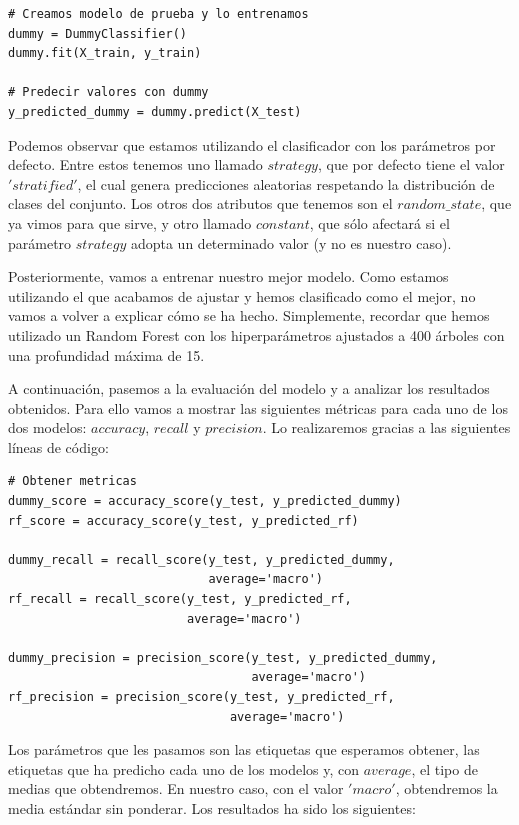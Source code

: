 \documentclass[11pt,a4paper]{article}
\begin{document}
\begin{lstlisting}
# Creamos modelo de prueba y lo entrenamos
dummy = DummyClassifier()
dummy.fit(X_train, y_train)

# Predecir valores con dummy
y_predicted_dummy = dummy.predict(X_test)
\end{lstlisting}

Podemos observar que estamos utilizando el clasificador con los parámetros por defecto. Entre estos tenemos uno llamado $strategy$, que por defecto tiene el valor $'stratified'$, el cual genera predicciones aleatorias respetando la distribución de clases del conjunto. Los otros dos atributos que tenemos son el $random\_state$, que ya vimos para que sirve, y otro llamado $constant$, que sólo afectará si el parámetro $strategy$ adopta un determinado valor (y no es nuestro caso).

Posteriormente, vamos a entrenar nuestro mejor modelo. Como estamos utilizando el que acabamos de ajustar y hemos clasificado como el mejor, no vamos a volver a explicar cómo se ha hecho. Simplemente, recordar que hemos utilizado un Random Forest con los hiperparámetros ajustados a 400 árboles con una profundidad máxima de 15.

A continuación, pasemos a la evaluación del modelo y a analizar los resultados obtenidos. Para ello vamos a mostrar las siguientes métricas para cada uno de los dos modelos: $accuracy$, $recall$ y $precision$. Lo realizaremos gracias a las siguientes líneas de código:

\begin{lstlisting}
# Obtener metricas
dummy_score = accuracy_score(y_test, y_predicted_dummy)
rf_score = accuracy_score(y_test, y_predicted_rf)

dummy_recall = recall_score(y_test, y_predicted_dummy,
                            average='macro')
rf_recall = recall_score(y_test, y_predicted_rf,
                         average='macro')

dummy_precision = precision_score(y_test, y_predicted_dummy,
                                  average='macro')
rf_precision = precision_score(y_test, y_predicted_rf,
                               average='macro')
\end{lstlisting}

Los parámetros que les pasamos son las etiquetas que esperamos obtener, las etiquetas que ha predicho cada uno de los modelos y, con
$average$, el tipo de medias que obtendremos. En nuestro caso, con el valor $'macro'$, obtendremos la media estándar sin ponderar. Los
resultados ha sido los siguientes:
\end{document}
